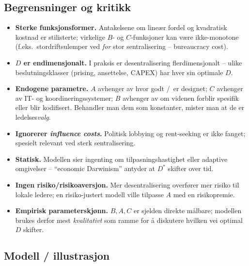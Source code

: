 \subsection*{Begrensninger og kritikk}
\begin{itemize}\setlength{\itemsep}{2pt}
\item \textbf{Sterke funksjonsformer.} Antakelsene om lineær fordel og kvadratisk kostnad er stilisterte; virkelige $B$- og $C$-funksjoner kan være ikke-monotone (f.eks.\ stordriftsulemper ved \emph{for} stor sentralisering -- bureaucracy cost).
\item \textbf{$D$ er endimensjonalt.} I praksis er desentralisering flerdimensjonalt -- ulike beslutningsklasser (prising, ansettelse, CAPEX) har hver sin optimale $D$.
\item \textbf{Endogene parametre.} $A$ avhenger av hvor godt \STwo/\SThree\ er designet; $C$ avhenger av IT- og koordineringssystemer; $B$ avhenger av om videnen forblir spesifik eller blir kodifisert. Behandler man dem som konstanter, mister man at de er ledelses\emph{valg}.
\item \textbf{Ignorerer \emph{influence costs}.} Politisk lobbying og rent-seeking er ikke fanget; spesielt relevant ved sterk sentralisering.
\item \textbf{Statisk.} Modellen sier ingenting om tilpasningshastighet eller adaptive omgivelser -- ``economic Darwinism'' antyder at $D^*$ skifter over tid.
\item \textbf{Ingen risiko/risikoaversjon.} Mer desentralisering overfører mer risiko til lokale ledere; en risiko-justert modell ville tilpasse $A$ med en risikopremie.
\item \textbf{Empirisk parameterskjønn.} $B, A, C$ er sjelden direkte målbare; modellen brukes derfor mest \emph{kvalitativt} som ramme for å diskutere hvilken vei optimal $D$ skifter.
\end{itemize}

\subsection*{Modell / illustrasjon}


